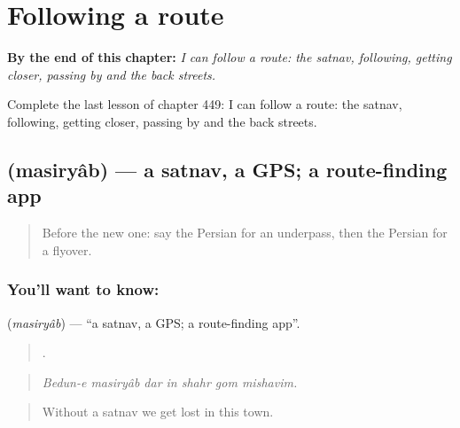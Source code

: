 
\chapter{Following a route}
\label{ch:fa-following-a-route}

\begin{chapteropening}
\textbf{By the end of this chapter:} \emph{I can follow a route: the satnav, following, getting closer, passing by and the back streets.}

Complete the last lesson of chapter 449: I can follow a route: the satnav, following, getting closer, passing by and the back streets.
\end{chapteropening}

\section[\texorpdfstring{\fa{مسیریاب} (masiryâb)}{مسیریاب (masiryâb)}]{ (masiryâb) — a satnav, a GPS; a route-finding app}

\label{lesson:FA-C449-masiryab}



\begin{quote}
Before the new one: say the Persian for an underpass, then the Persian for a flyover.
\end{quote}

\subsection*{You'll want to know: }
\textbf{} (\emph{masiryâb}) — \textquotedblleft{}a satnav, a GPS; a route-finding app\textquotedblright{}.

\begin{quote}
      .
\end{quote}

\begin{quote}
\emph{Bedun-e masiryâb dar in shahr gom mishavim.}
\end{quote}

\begin{quote}
Without a satnav we get lost in this town.
\end{quote}

